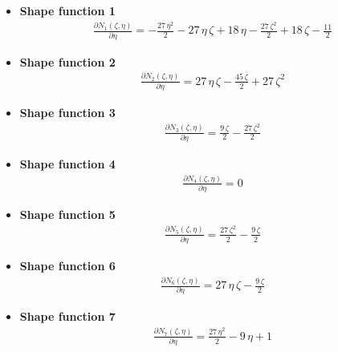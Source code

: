\documentclass{article}
\begin{document}
\begin{itemize}
	\item \textbf{Shape function 1}\newline
	\begin{align}
	\frac{\partial N_1(\zeta, \eta)}{\partial \eta} = -\frac{27\,\eta ^2}{2}-27\,\eta \,\zeta+18\,\eta -\frac{27\,{\zeta}^2}{2}+18\,\zeta-\frac{11}{2}
	\end{align}
	
	
	\item \textbf{Shape function 2}\newline
	\begin{align}
	\frac{\partial N_2(\zeta, \eta)}{\partial \eta} = 27\,\eta \,\zeta-\frac{45\,\zeta}{2}+27\,{\zeta}^2
	\end{align}
	
	
	\item \textbf{Shape function 3}\newline
	\begin{align}
	\frac{\partial N_3(\zeta, \eta)}{\partial \eta} = \frac{9\,\zeta}{2}-\frac{27\,{\zeta}^2}{2}
	\end{align}
	
	
	\item \textbf{Shape function 4}\newline
	\begin{align}
	\frac{\partial N_4(\zeta, \eta)}{\partial \eta} = 0
	\end{align}
	
	
	\item \textbf{Shape function 5}\newline
	\begin{align}
	\frac{\partial N_5(\zeta, \eta)}{\partial \eta} = \frac{27\,{\zeta}^2}{2}-\frac{9\,\zeta}{2}
	\end{align}
	
	
	\item \textbf{Shape function 6}\newline
	\begin{align}
	\frac{\partial N_6(\zeta, \eta)}{\partial \eta} = 27\,\eta \,\zeta-\frac{9\,\zeta}{2}
	\end{align}
	
	
	\item \textbf{Shape function 7}\newline
	\begin{align}
	\frac{\partial N_7(\zeta, \eta)}{\partial \eta} = \frac{27\,\eta ^2}{2}-9\,\eta +1
	\end{align}
	

\end{itemize}
\end{document}
